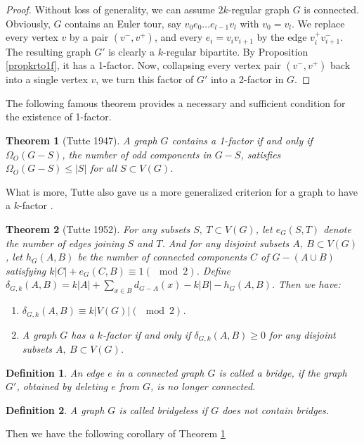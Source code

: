 \documentclass[12pt]{report}
\newtheorem{theorem}{Theorem}
\newtheorem{definition}{Definition}
\begin{document}
\begin{proof}
Without loss of generality, we can assume $2k$-regular graph $G$ is connected. Obviously, $G$ contains an Euler tour, say $v_0e_0\ldots e_{l-1}v_l$ with $v_0=v_l$. We replace every vertex $v$ by a pair $(v^-,v^+)$, and every $e_i=v_iv_{i+1}$ by the edge $v_i^+v^-_{i+1}$. The resulting graph $G'$ is clearly a $k$-regular bipartite. By Proposition \ref{propkrto1f}, it has a 1-factor. Now, collapsing every vertex pair $(v^-,v^+)$ back into a single vertex $v$, we turn this factor of $G'$ into a 2-factor in $G$.
\end{proof}

The following famous theorem provides a necessary and sufficient condition for the existence of 1-factor.
\begin{theorem}[Tutte 1947]\label{tutte otto1f}
A graph $G$ contains a 1-factor if and only if $\Omega_O(G-S)$, the number of odd components in $G-S$, satisfies $\Omega_O(G-S)\le|S|$ for all $S\subset V(G)$.
\end{theorem}


What is more, Tutte also gave us a more generalized criterion for a graph to have a $k$-factor \cite{tutte1952factors}.

\begin{theorem}[Tutte 1952]\label{tut1952cri1}
For any subsets $S,~T\subset V(G)$, let $e_G(S,T)$ denote the number of edges joining $S$ and $T$. And for any disjoint subsets $A,~B\subset V(G)$, let $h_G(A,B)$ be the number of connected components $C$ of $G-(A\cup B)$ satisfying $k|C|+e_G(C,B)\equiv1(\mod2)$. Define $\delta_{G,k}(A,B)=k|A|+\sum_{x\in B}d_{G-A}(x)-k|B|-h_G(A,B)$. Then we have:
\begin{enumerate}
\item $\delta_{G,k}(A,B)\equiv k|V(G)|(\mod2)$.
\item A graph $G$ has a $k$-factor if and only if $\delta_{G,k}(A,B)\ge0$ for any disjoint subsets $A,~B\subset V(G)$.
\end{enumerate}
\end{theorem}



\begin{definition}
An edge $e$ in a connected graph $G$ is called a bridge, if the graph $G'$, obtained by deleting $e$ from $G$, is no longer connected.
\end{definition}
\begin{definition}\label{bilede}
A graph $G$ is called bridgeless if $G$ does not contain bridges.
\end{definition}
Then we have the following corollary of Theorem \ref{tutte otto1f}
\end{document}
